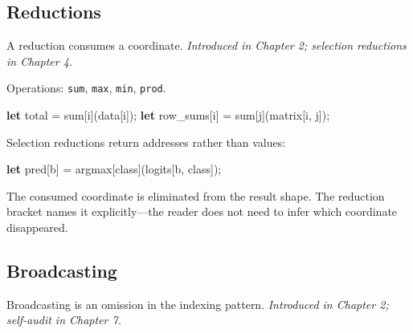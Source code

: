 \documentclass[11pt,titlepage]{article}
\newenvironment{Shaded}{}{}
\newcommand{\KeywordTok}[1]{\textcolor[rgb]{0.00,0.44,0.13}{\textbf{#1}}}
\newcommand{\NormalTok}[1]{#1}
\newcommand{\OperatorTok}[1]{\textcolor[rgb]{0.40,0.40,0.40}{#1}}
\begin{document}
\vspace{2em}

\hypertarget{reductions}{%
\subsection{Reductions}\label{reductions}}

A reduction consumes a coordinate. \emph{Introduced in Chapter 2;
selection reductions in Chapter 4.}

Operations: \texttt{sum}, \texttt{max}, \texttt{min}, \texttt{prod}.

\begin{Shaded}
\begin{Highlighting}[]
\KeywordTok{let}\NormalTok{ total = sum}\OperatorTok{[}\NormalTok{i}\OperatorTok{]}\NormalTok{(data}\OperatorTok{[}\NormalTok{i}\OperatorTok{]}\NormalTok{);}
\KeywordTok{let}\NormalTok{ row_sums}\OperatorTok{[}\NormalTok{i}\OperatorTok{]}\NormalTok{ = sum}\OperatorTok{[}\NormalTok{j}\OperatorTok{]}\NormalTok{(matrix}\OperatorTok{[}\NormalTok{i, j}\OperatorTok{]}\NormalTok{);}
\end{Highlighting}
\end{Shaded}

Selection reductions return addresses rather than values:

\begin{Shaded}
\begin{Highlighting}[]
\KeywordTok{let}\NormalTok{ pred}\OperatorTok{[}\NormalTok{b}\OperatorTok{]}\NormalTok{ = argmax}\OperatorTok{[}\NormalTok{class}\OperatorTok{]}\NormalTok{(logits}\OperatorTok{[}\NormalTok{b, class}\OperatorTok{]}\NormalTok{);}
\end{Highlighting}
\end{Shaded}

The consumed coordinate is eliminated from the result shape. The
reduction bracket names it explicitly---the reader does not need to
infer which coordinate disappeared.

\vspace{2em}

\hypertarget{broadcasting-1}{%
\subsection{Broadcasting}\label{broadcasting-1}}

Broadcasting is an omission in the indexing pattern. \emph{Introduced in
Chapter 2; self-audit in Chapter 7.}
\end{document}
